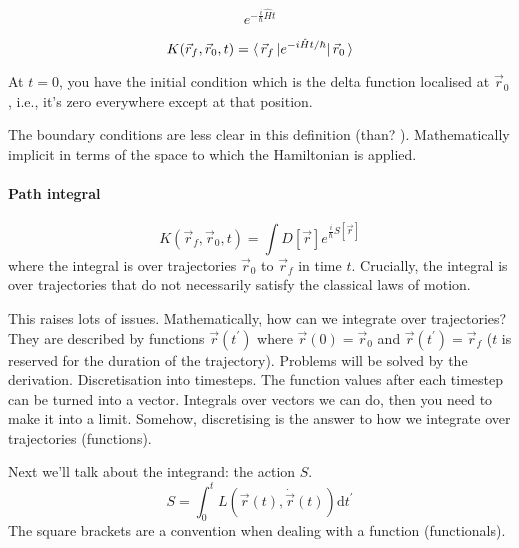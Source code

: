 \documentclass[a4paper]{extarticle}
\newcommand{\tpr}{t^\prime}
\newcommand{\dtpr}{\text{d}t^\prime}
\begin{document}
\begin{dfn}
  \begin{equation}
    e^{-\frac{i}{\hbar} \hat{H} t}
  \end{equation}
\end{dfn}

\begin{dfn}[Propagator]
  \begin{equation}
    K(\vec{r}_f, \vec{r}_0, t) = \langle\,\vec{r}_f\,\rvert e^{-i \hat{H} t / \hbar}
    \lvert\,\vec{r}_0\,\rangle
  \end{equation}
\end{dfn}

At $t = 0$, you
have the initial condition which is the delta function localised at
$\vec{r}_0$, i.e., it's zero everywhere except at that position.

The boundary conditions are less clear in this definition (than?
).
Mathematically implicit in terms of the space to which the Hamiltonian is
applied.

\paragraph{Path integral}

\begin{equation}
  K(\vec{r}_f, \vec{r}_0, t) = \int D \left[\vec{r}\right] e^{\frac{i}{\hbar}
      S\left[\vec{r}\right] }
\end{equation}
where the integral is over trajectories
$\vec{r}_0$ to $\vec{r}_f$ in time $t$.
Crucially, the integral is over trajectories that do not necessarily satisfy
the classical laws of motion.

This raises lots of issues.
Mathematically, how can we integrate over trajectories?
They are described by functions $\vec{r}(\tpr)$ where $\vec{r}(0) = \vec{r}_0$
and $\vec{r}(\tpr) = \vec{r}_f$ ($t$ is reserved for the duration of the
trajectory).
Problems will be solved by the derivation.
Discretisation into timesteps.
The function values after each timestep can be turned into a vector.
Integrals over vectors we can do, then you need to make it into a limit.
Somehow, discretising is the answer to how we integrate over trajectories
(functions).

Next we'll talk about the integrand: the action $S$.
\begin{equation}
  S = \int_0^t L\left(\vec{r}(t), \dot{\vec{r}}(t)\right) \dtpr
\end{equation}
The square brackets are a convention when dealing with a function
(functionals).
\end{document}
